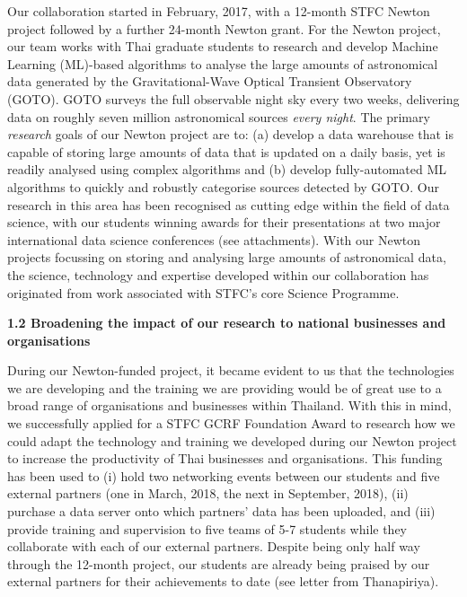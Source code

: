 \documentclass[11pt]{article}
\begin{document}
  \vspace{2mm}
  \noindent
  Our collaboration started in February, 2017, with a 12-month STFC Newton project followed by a further 24-month Newton grant. For the Newton project, our team works with Thai graduate students to research and develop Machine Learning (ML)-based algorithms to analyse the large amounts of astronomical data generated by the Gravitational-Wave Optical Transient Observatory (GOTO). GOTO surveys the full observable night sky every two weeks, delivering data on roughly seven million astronomical sources {\it every night}. The primary {\it research} goals of our Newton project are to: (a) develop a data warehouse that is capable of storing large amounts of data that is updated on a daily basis, yet is readily analysed using complex algorithms and (b) develop fully-automated ML algorithms to quickly and robustly categorise sources detected by GOTO. Our research in this area has been recognised as cutting edge within the field of data science, with our students winning awards for their presentations at two major international data science conferences (see attachments). With our Newton projects focussing on storing and analysing large amounts of astronomical data, the science, technology and expertise developed within our collaboration has originated from work associated with STFC's core Science Programme. 
  
  \vspace{3mm}
  \noindent
  {\large \bf 1.2 Broadening the impact of our research to national businesses and organisations}
  
  \noindent
  During our Newton-funded project, it became evident to us that the technologies we are developing and the training we are providing would be of great use to a broad range of organisations and businesses within Thailand. With this in mind, we successfully applied for a STFC GCRF Foundation Award to research how we could adapt the technology and training we developed during our Newton project to increase the productivity of Thai businesses and organisations. This funding has been used to (i) hold two networking events between our students and five external partners (one in March, 2018, the next in September, 2018), (ii) purchase a data server onto which partners' data has been uploaded, and (iii) provide training and supervision to five teams of 5-7 students while they collaborate with each of our external partners. Despite being only half way through the 12-month project, our students are already being praised by our external partners for their achievements to date (see letter from Thanapiriya).
  
\end{document}
